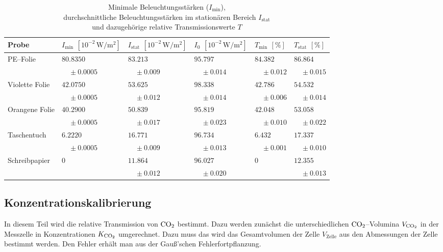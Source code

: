 \documentclass[12pt,a4paper]{scrartcl}
\numberwithin{equation}{section} %
\begin{document}
\begin{table}[h!]
	\centering
	\begin{tabular}{l|p{2.1cm}|p{2.1cm}|p{2.1cm}|p{1.8cm}|p{1.8cm}}
		Probe
			& $I_\mathrm{min}$ $[10^{-2} \mathrm{\, W/m^2}]$
			& $I_\mathrm{stat}$ $[10^{-2} \mathrm{\, W/m^2}]$
			& $I_0$ $[10^{-2} \mathrm{\, W/m^2}]$
			& $T_\mathrm{min}$ $[\%]$
			& $T_\mathrm{stat}$ $[\%]$ \\
		\hline
		PE--Folie
			& $80.8350$
			& $83.213$
			& $95.797$
			& $84.382$
			& $86.864$ \\
			& $\quad\pm 0.0005$
			& $\quad\pm 0.009$
			& $\quad\pm 0.014$
			& $\quad\pm 0.012$
			& $\quad\pm 0.015$ \\
		Violette Folie
			& $42.0750$
			& $53.625$
			& $98.338$
			& $42.786$
			& $54.532$ \\
			& $\quad\pm 0.0005$
			& $\quad\pm 0.012$
			& $\quad\pm 0.014$
			& $\quad\pm 0.006$
			& $\quad\pm 0.014$ \\
		Orangene Folie
			 & $40.2900$
			 & $50.839$
			 & $95.819$
			 & $42.048$
			 & $53.058$ \\
			 & $\quad\pm 0.0005$
             & $\quad\pm 0.017$
			 & $\quad\pm 0.023$
			 & $\quad\pm 0.010$
			 & $\quad\pm 0.022$ \\
		Taschentuch
			 & $6.2220$
			 & $16.771$
			 & $96.734$
			 & $6.432$
			 & $17.337$ \\
			 & $\quad\pm 0.0005$
			 & $\quad\pm 0.009$
			 & $\quad\pm 0.013$
			 & $\quad\pm 0.001$
			 & $\quad\pm 0.010$ \\
		Schreibpapier
			 & $0$
			 & $11.864$
			 & $96.027$
			 & $0$
			 & $12.355$ \\
			 &&$\quad\pm 0.012$
			 & $\quad\pm 0.020$
			 && $\quad\pm 0.013$ \\
	\end{tabular}
	\caption{Minimale Beleuchtungsstärken ($I_\mathrm{min}$),\\
		durchschnittliche Beleuchtungsstärken im stationären Bereich $I_\mathrm{stat}$\\
		und dazugehörige relative Transmissionswerte $T$}
	\label{table:materialien}
\end{table}

\subsection{Konzentrationskalibrierung}
\label{Konzentrationskalibrierung}

In diesem Teil wird die relative Transmission von $\ce{CO_2}$ bestimmt. Dazu werden zunächst die unterschiedlichen $\ce{CO_2}$--Volumina $V_{\ce{CO_2}}$ in der Messzelle in Konzentrationen $K_{\ce{CO_2}}$ umgerechnet. Dazu muss das wird das Gesamtvolumen der Zelle $V_\mathrm{Zelle}$ aus den Abmessungen der Zelle bestimmt werden. Den Fehler erhält man aus der Gauß'schen Fehlerfortpflanzung.
\end{document}
